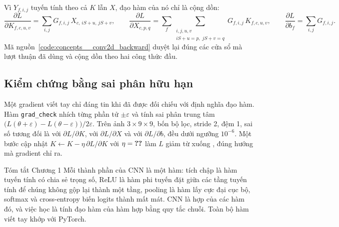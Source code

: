 Vì $Y_{f,i,j}$ tuyến tính theo cả $K$ lẫn $X$, đạo hàm của nó chỉ là cộng dồn:
\[
  \frac{\partial L}{\partial K_{f,c,u,v}} = \sum_{i,j} G_{f,i,j}\, X_{c,\,iS+u,\,jS+v},\qquad
  \frac{\partial L}{\partial X_{c,p,q}} = \sum_{f}\sum_{\substack{i,j,u,v\\ iS+u=p,\; jS+v=q}} G_{f,i,j}\, K_{f,c,u,v},\qquad
  \frac{\partial L}{\partial b_f} = \sum_{i,j} G_{f,i,j}.
\]
Mã nguồn~\ref{code:concepts__conv2d_backward} duyệt lại đúng các cửa sổ mà lượt thuận đã dùng và cộng
dồn theo hai công thức đầu.


\subsection{Kiểm chứng bằng sai phân hữu hạn}

Một gradient viết tay chỉ đáng tin khi đã được đối chiếu với định nghĩa đạo hàm. Hàm \texttt{grad\_check}
nhích từng phần tử $\pm\varepsilon$ và tính sai phân trung tâm $\bigl(L(\theta+\varepsilon)-L(\theta-\varepsilon)\bigr)/2\varepsilon$.
Trên ảnh $3\times9\times9$, bốn bộ lọc, stride 2, đệm 1, sai số tương đối là  với $\partial L/\partial K$,
 với $\partial L/\partial X$ và  với $\partial L/\partial b$, đều dưới
ngưỡng $10^{-6}$. Một bước cập nhật $K\leftarrow K-\eta\,\partial L/\partial K$ với $\eta=\SL{concepts/gd_step/eta}$ làm
$L$ giảm từ  xuống , đúng hướng mà gradient chỉ ra.


\begin{phathien}{Tóm tắt Chương 1}
Mỗi thành phần của CNN là một hàm: tích chập là hàm tuyến tính có chia sẻ trọng số, ReLU là hàm phi tuyến
đặt giữa các tầng tuyến tính để chúng không gộp lại thành một tầng, pooling là hàm lấy cực đại cục bộ,
softmax và cross-entropy biến logits thành mất mát. CNN là hợp của các hàm đó, và việc học là tính đạo hàm
của hàm hợp bằng quy tắc chuỗi. Toàn bộ  hàm viết tay khớp với PyTorch.
\end{phathien}
